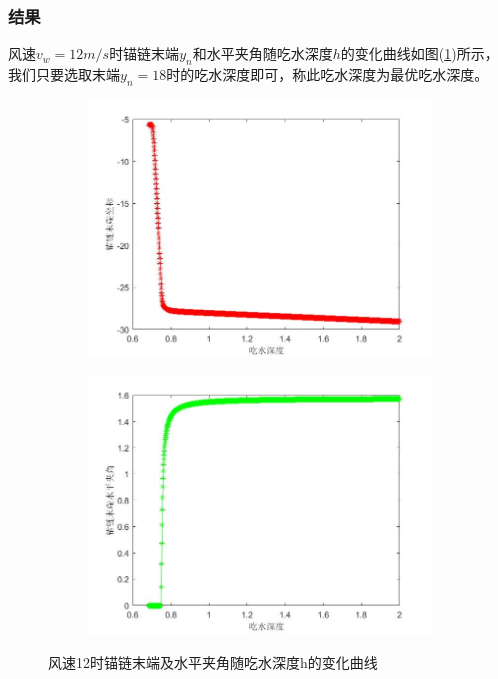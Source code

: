 \documentclass[UTF8]{ctexbook}
\theoremstyle{nonumberplain}
\begin{document}
        \subsubsection{结果}
            \par
            风速$v_w=12m/s$时锚链末端$y_n$和水平夹角随吃水深度$h$的变化曲线如图(\ref{风速12时锚链末端及水平夹角随吃水深度h的变化曲线})所示，我们只要选取末端$y_n = 18$时的吃水深度即可，称此吃水深度为最优吃水深度。
            \begin{figure}[H]
                \centering
                \begin{subfigure}[b]{0.4\textwidth}
                    \includegraphics[width=\textwidth]{images/v_wind_12_yn_h.jpg}
                \end{subfigure}
                \begin{subfigure}[b]{0.4\textwidth}
                    \includegraphics[width=\textwidth]{images/v_wind_12_alpha_h.jpg}
                \end{subfigure}
                \caption{风速12时锚链末端及水平夹角随吃水深度h的变化曲线}
                \label{风速12时锚链末端及水平夹角随吃水深度h的变化曲线}
            \end{figure}
\end{document}
